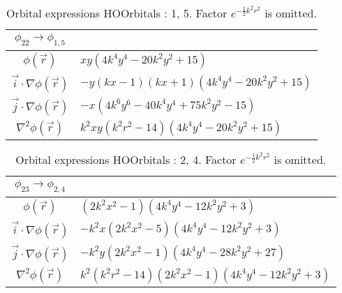 \begin{table}
\begin{center}
\begin{tabular}{c|l}
$\phi_{22} \rightarrow \phi_{1, 5}$\\
\hline
$\phi(\vec r)$ & $x y \left(4 k^{4} y^{4} - 20 k^{2} y^{2} + 15\right)$\\
\hline
$\vec i\cdot \nabla \phi(\vec r)$ & $- y \left(k x -1\right) \left(k x + 1\right) \left(4 k^{4} y^{4} - 20 k^{2} y^{2} + 15\right)$\\
$\vec j\cdot \nabla \phi(\vec r)$ & $- x \left(4 k^{6} y^{6} - 40 k^{4} y^{4} + 75 k^{2} y^{2} -15\right)$\\
\hline
$\nabla^2 \phi(\vec r)$ & $k^{2} x y \left(k^{2} r^{2} -14\right) \left(4 k^{4} y^{4} - 20 k^{2} y^{2} + 15\right)$\\
\end{tabular}
\caption{Orbital expressions HOOrbitals : 1, 5. Factor $e^{- \frac{1}{2} k^{2} r^{2}}$ is omitted.}
\end{center}
\end{table}


\begin{table}
\begin{center}
\begin{tabular}{c|l}
$\phi_{23} \rightarrow \phi_{2, 4}$\\
\hline
$\phi(\vec r)$ & $\left(2 k^{2} x^{2} -1\right) \left(4 k^{4} y^{4} - 12 k^{2} y^{2} + 3\right)$\\
\hline
$\vec i\cdot \nabla \phi(\vec r)$ & $- k^{2} x \left(2 k^{2} x^{2} -5\right) \left(4 k^{4} y^{4} - 12 k^{2} y^{2} + 3\right)$\\
$\vec j\cdot \nabla \phi(\vec r)$ & $- k^{2} y \left(2 k^{2} x^{2} -1\right) \left(4 k^{4} y^{4} - 28 k^{2} y^{2} + 27\right)$\\
\hline
$\nabla^2 \phi(\vec r)$ & $k^{2} \left(k^{2} r^{2} -14\right) \left(2 k^{2} x^{2} -1\right) \left(4 k^{4} y^{4} - 12 k^{2} y^{2} + 3\right)$\\
\end{tabular}
\caption{Orbital expressions HOOrbitals : 2, 4. Factor $e^{- \frac{1}{2} k^{2} r^{2}}$ is omitted.}
\end{center}
\end{table}


